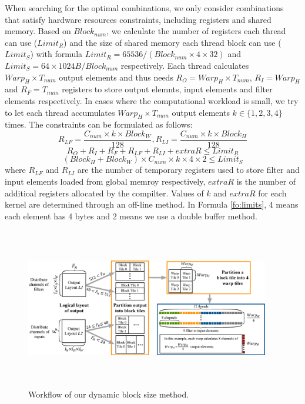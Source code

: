 When searching for the optimal combinations, we only consider combinations that satisfy hardware resources constraints, including registers and shared memory.
Based on $Block_{num}$, we calculate the number of registers each thread can use ($Limit_R$) and the size of shared memory each thread block can use ($Limit_S$) with formula $Limit_R=65536/(Block_{num}\times 4\times 32)$ and $Limit_S=64 \times 1024B/Block_{num}$ respectively.
Each thread calculates $Warp_H \times T_{num}$ output elements and thus needs $R_O=Warp_H \times T_{num}$, $R_I=Warp_H$ and $R_F=T_{num}$ registers to store output elemnts, input elements and filter elements respectively.
In cases where the computational workload is small, we try to let each thread accumulates $Warp_H \times T_{num}$ output elements $k \in \{1,2,3,4\}$ times.
The constraints can be formulated as follows:
\begin{equation}\nonumber
R_{LF}=\frac{C_{num} \times k \times Block_W}{128},R_{LI}=\frac{C_{num} \times k \times Block_H}{128}
\end{equation}
\begin{equation}
    \label{fo:limitr}
R_O+R_I+R_F+R_{LF}+R_{LI}+extraR \leq Limit_R
\end{equation}
\begin{equation}
    \label{fo:limits}
(Block_H+Block_W)\times C_{num} \times k \times 4 \times 2 \leq Limit_S
\end{equation}
where $R_{LF}$ and $R_{LI}$ are the number of temporary registers used to store filter and input elements loaded from global memroy respectively, $extraR$ is the number of additioal registers allocated by the compilter. Values of $k$ and $extraR$ for each kernel are determined through an off-line method. In Formula \ref{fo:limits}, 4 means each element has 4 bytes and 2 means we use a double buffer method.
\begin{figure}
	\centering
    \includegraphics[width=0.95\textwidth,height=7cm]{./figure/pwworkflow.eps}
    \caption{Workflow of our dynamic block size method.} \label{fig:pwworkflow}
\end{figure}

